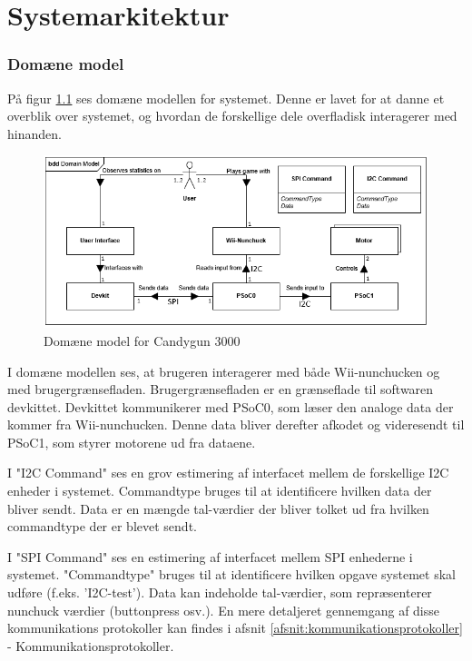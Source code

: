 \chapter{Systemarkitektur}

\subsection{Domæne model}
På figur \ref{fig:DomainModel} ses domæne modellen for systemet. Denne er lavet for at danne et overblik over systemet, og hvordan de forskellige dele overfladisk interagerer med hinanden. 

\begin{figure}[H]
	\centering
	\includegraphics[width=\textwidth]{Systemarkitektur/images/DomainModel}
	\caption{Domæne model for Candygun 3000}
	\label{fig:DomainModel}
\end{figure}

I domæne modellen ses, at brugeren interagerer med både Wii-nunchucken og med brugergrænsefladen. Brugergrænsefladen er en grænseflade til softwaren devkittet. Devkittet kommunikerer med PSoC0, som læser den analoge data der kommer fra Wii-nunchucken. Denne data bliver derefter afkodet og videresendt til PSoC1, som styrer motorene ud fra dataene.

I "I2C Command" ses en grov estimering af interfacet mellem de forskellige I2C enheder i systemet. Commandtype bruges til at identificere hvilken data der bliver sendt. Data er en mængde tal-værdier der bliver tolket ud fra hvilken commandtype der er blevet sendt.

I "SPI Command" ses en estimering af interfacet mellem SPI enhederne i systemet. "Commandtype" bruges til at identificere hvilken opgave systemet skal udføre (f.eks. 'I2C-test'). Data kan indeholde tal-værdier, som repræsenterer nunchuck værdier (buttonpress osv.). 
En mere detaljeret gennemgang af disse kommunikations protokoller kan findes i afsnit \ref{afsnit:kommunikationsprotokoller} - Kommunikationsprotokoller.

